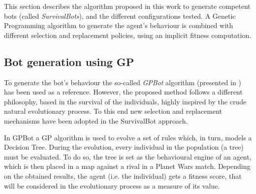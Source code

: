 \documentclass[conference]{IEEEtran}
\begin{document}





%

This section describes the algorithm proposed in this work to generate competent bots (called {\em SurvivalBots}), and the different configurations tested. A Genetic Programming \cite{GP_Koza92} algorithm to generate the agent's behaviour is combined with different selection and replacement policies, using an implicit fitness computation.


\subsection{Bot generation using GP}
\label{subsec:generationgp}

To generate the bot's behaviour the so-called {\em GPBot} algorithm (presented in \cite{GarciaGP14}) has been used as a reference. However, the proposed method follows a different philosophy, based in the survival of the individuals, highly inspired by the crude natural evolutionary process. To this end new selection and replacement mechanisms have been adopted in the SurvivalBot approach.

In GPBot a GP algorithm is used to evolve a set of rules which, in turn, models a Decision Tree.
During the evolution, every individual in the population (a tree) must be evaluated. To do so, the tree is set as the behavioural engine of an agent, which is then placed in a map against a rival in a Planet Wars match. Depending on the obtained results, the agent (i.e. the individual) gets a fitness score, that will be considered in the evolutionary process as a measure of its value.
\end{document}
